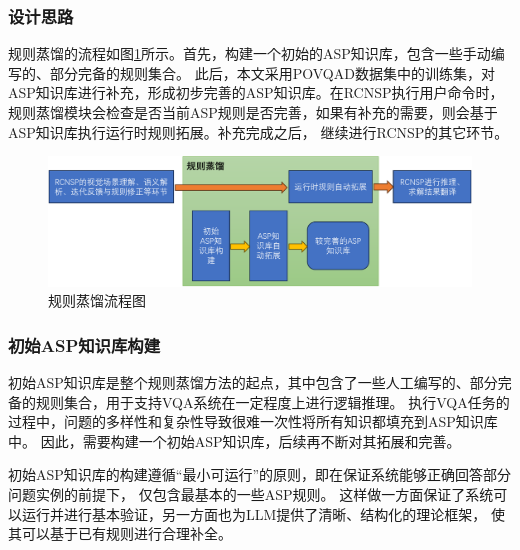 \subsubsection{设计思路}
规则蒸馏的流程如图\ref{distill-process}所示。首先，构建一个初始的ASP知识库，包含一些手动编写的、部分完备的规则集合。
此后，本文采用POVQAD数据集中的训练集，对ASP知识库进行补充，形成初步完善的ASP知识库。在RCNSP执行用户命令时，
规则蒸馏模块会检查是否当前ASP规则是否完善，如果有补充的需要，则会基于ASP知识库执行运行时规则拓展。补充完成之后，
继续进行RCNSP的其它环节。
\begin{figure}[h]
    \centering
    \includegraphics[scale=0.7]{figures/distillation-crop.pdf}
    \caption{规则蒸馏流程图}
    \label{distill-process}
\end{figure}
\subsubsection{初始ASP知识库构建}
初始ASP知识库是整个规则蒸馏方法的起点，其中包含了一些人工编写的、部分完备的规则集合，用于支持VQA系统在一定程度上进行逻辑推理。
执行VQA任务的过程中，问题的多样性和复杂性导致很难一次性将所有知识都填充到ASP知识库中。
因此，需要构建一个初始ASP知识库，后续再不断对其拓展和完善。

初始ASP知识库的构建遵循“最小可运行”的原则，即在保证系统能够正确回答部分问题实例的前提下，
仅包含最基本的一些ASP规则。
这样做一方面保证了系统可以运行并进行基本验证，另一方面也为LLM提供了清晰、结构化的理论框架，
使其可以基于已有规则进行合理补全。

